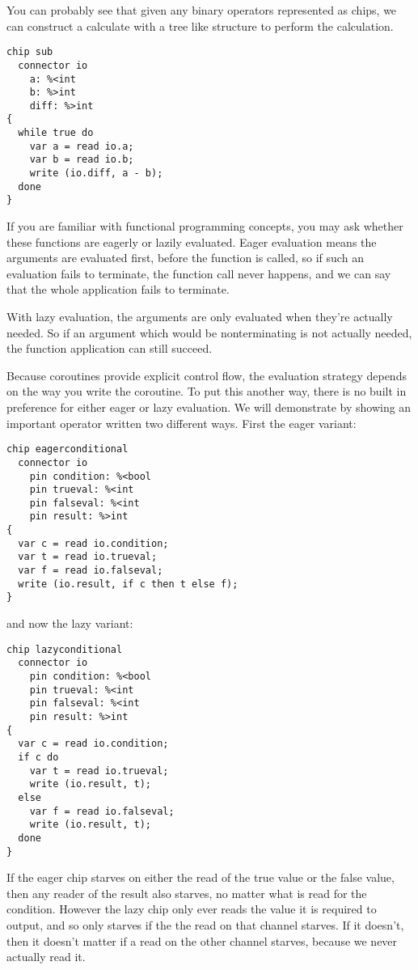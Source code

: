 \documentclass[oneside]{book}
\begin{document}
You can probably see that given any binary operators represented
as chips, we can construct a calculate with a tree like structure
to perform the calculation.

\begin{verbatim}
chip sub
  connector io
    a: %<int
    b: %>int
    diff: %>int
{
  while true do
    var a = read io.a;
    var b = read io.b;
    write (io.diff, a - b);
  done
}
\end{verbatim}


If you are familiar with functional programming concepts, you may
ask whether these functions are eagerly or lazily evaluated.
Eager evaluation means the arguments are evaluated first,
before the function is called, so if such an evaluation fails
to terminate, the function call never happens, and we can say that
the whole application fails to terminate.

With lazy evaluation, the arguments are only evaluated when they're
actually needed. So if an argument which would be nonterminating
is not actually needed, the function application can still succeed.

Because coroutines provide explicit control flow, the evaluation
strategy depends on the way you write the coroutine. To put this
another way, there is no built in preference for either eager or
lazy evaluation. We will demonstrate by showing an important
operator written two different ways. First the eager variant:

\begin{verbatim}
chip eagerconditional
  connector io
    pin condition: %<bool
    pin trueval: %<int
    pin falseval: %<int
    pin result: %>int
{
  var c = read io.condition;
  var t = read io.trueval;
  var f = read io.falseval;
  write (io.result, if c then t else f);
}
\end{verbatim}

and now the lazy variant:

\begin{verbatim}
chip lazyconditional
  connector io
    pin condition: %<bool
    pin trueval: %<int
    pin falseval: %<int
    pin result: %>int
{
  var c = read io.condition;
  if c do
    var t = read io.trueval;
    write (io.result, t);
  else 
    var f = read io.falseval;
    write (io.result, t);
  done
}
\end{verbatim}

If the eager chip starves on either the read of the true value
or the false value, then any reader of the result also starves,
no matter what is read for the condition. However the lazy
chip only ever reads the value it is required to output,
and so only starves if the the read on that channel starves.
If it doesn't, then it doesn't matter if a read on the
other channel starves, because we never actually read it.
\end{document}
